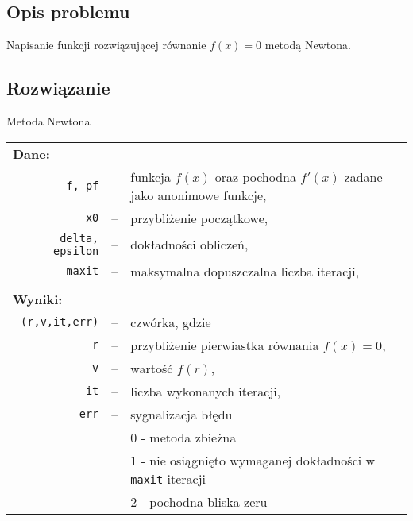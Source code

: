 \documentclass[11pt]{mk-polish-lab-report}
\begin{document}
\subsection{Opis problemu}
Napisanie funkcji rozwiązującej równanie $f(x) = 0$ metodą Newtona.

\subsection{Rozwiązanie}

\begin{algorithm}[h]
\caption{Metoda Newtona}
\label{alg:new}
\DontPrintSemicolon
{}
\end{algorithm}

\begin{longtable}[l]{r  c  l}
\multicolumn{1}{l}{\textbf{Dane:}}&& \\
\texttt{f, pf}&--&funkcja $f(x)$ oraz pochodna $f'(x)$ zadane jako anonimowe funkcje, \\
\texttt{x0}&--&przybliżenie początkowe, \\
\texttt{delta, epsilon}&--&dokładności obliczeń, \\
\texttt{maxit}&--&maksymalna dopuszczalna liczba iteracji, \\
&& \\
\multicolumn{1}{l}{\textbf{Wyniki:}}&& \\
\texttt{(r,v,it,err)}&--&czwórka, gdzie \\
\texttt{r}&--&przybliżenie pierwiastka równania $f(x) = 0$, \\
\texttt{v}&--&wartość $f(r)$, \\
\texttt{it}&--&liczba wykonanych iteracji, \\
\texttt{err}&--&sygnalizacja błędu \\
&&$0$ - metoda zbieżna \\
&&$1$ - nie osiągnięto wymaganej dokładności w \texttt{maxit} iteracji \\
&&$2$ - pochodna bliska zeru \\
\end{longtable}
\end{document}
